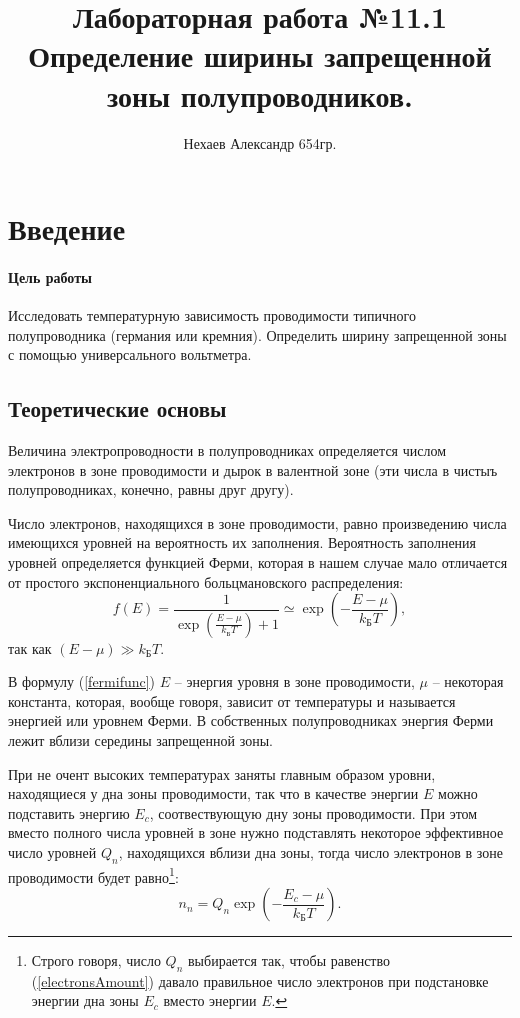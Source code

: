 \documentclass[a4paper, 12pt]{article}
\begin{document}
	\title{Лабораторная работа №11.1\\Определение ширины запрещенной зоны полупроводников.}
	\author{Нехаев Александр 654гр.}
	\maketitle
	\tableofcontents
	\section{Введение}
	\paragraph{Цель работы}
	Исследовать температурную зависимость проводимости типичного полупроводника (германия или кремния). Определить ширину запрещенной зоны с помощью универсального вольтметра.
	\subsection{Теоретические основы}
	Величина электропроводности в полупроводниках определяется числом электронов в зоне проводимости и дырок в валентной зоне (эти числа в чистыъ полупроводниках, конечно, равны друг другу).

	Число электронов, находящихся в зоне проводимости, равно произведению числа имеющихся уровней на вероятность их заполнения. Вероятность заполнения уровней определяется функцией Ферми, которая в нашем случае мало отличается от простого экспоненциального больцмановского распределения:
	\begin{equation}
		f(E) = \frac{1}{\exp\left(\frac{E-\mu}{k_{\text{Б}}T}\right)+1}\simeq\exp{\left(-\frac{E-\mu}{k_{\text{Б}}T}\right)},
		\label{fermifunc}
	\end{equation}
	так как $(E-\mu)\gg k_{\text{Б}}T$.

	В формулу (\ref{fermifunc}) $E$ -- энергия уровня в зоне проводимости, $\mu$ -- некоторая константа, которая, вообще говоря, зависит от температуры и называется энергией или уровнем Ферми. В собственных полупроводниках энергия Ферми лежит вблизи середины запрещенной зоны.

	При не очент высоких температурах заняты главным образом уровни, находящиеся у дна зоны проводимости, так что в качестве энергии $E$ можно подставить энергию $E_c$, соотвествующую дну зоны проводимости. При этом вместо полного числа уровней в зоне нужно подставлять некоторое эффективное число уровней $Q_n$, находящихся вблизи дна зоны, тогда число электронов в зоне проводимости будет равно\footnote{Строго говоря, число $Q_n$ выбирается так, чтобы равенство (\ref{electronsAmount}) давало правильное число электронов при подстановке энергии дна зоны $E_c$ вместо энергии $E$.}:
	\begin{equation}
		n_n=Q_n\exp{\left(-\frac{E_c-\mu}{k_{\text{Б}}T}\right)}.
		\label{electronsAmount}
	\end{equation}
\end{document}
